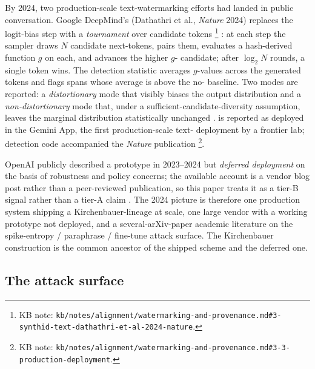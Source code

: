 By 2024, two production-scale text-watermarking efforts had landed in
public conversation. Google DeepMind's \textbf{} (Dathathri
et al., \emph{Nature} 2024) replaces the logit-bias step with a
\emph{tournament} over candidate tokens%
\footnote{KB note: \texttt{kb/notes/alignment/watermarking-and-provenance.md\#3-synthid-text-dathathri-et-al-2024-nature}.}
: at each
step the sampler draws $N$ candidate next-tokens, pairs them, evaluates
a hash-derived  function $g$ on each, and advances the higher
$g$- candidate; after $\log_2 N$ rounds, a single token wins. The
detection statistic averages $g$-values across the generated tokens and
flags spans whose average is above the no- baseline. Two modes
are reported: a \emph{distortionary} mode that visibly biases the
output distribution and a \emph{non-distortionary} mode that, under
a sufficient-candidate-diversity assumption, leaves the marginal
distribution statistically unchanged .  is reported as
deployed in the Gemini App, the first production-scale text-
deployment by a frontier lab; detection code accompanied the
\emph{Nature} publication%
\footnote{KB note: \texttt{kb/notes/alignment/watermarking-and-provenance.md\#3-3-production-deployment}.}.

OpenAI publicly described a  prototype in 2023--2024 but
\emph{deferred deployment} on the basis of robustness and policy
concerns; the available account is a vendor blog post rather than a
peer-reviewed publication, so this paper treats it as a tier-B signal
rather than a tier-A claim
.
The 2024 picture is therefore one production system shipping a
Kirchenbauer-lineage  at scale, one large vendor with a
working prototype not deployed, and a several-arXiv-paper academic
literature on the spike-entropy / paraphrase / fine-tune attack
surface. The Kirchenbauer construction is the common ancestor of the
shipped scheme and the deferred one.

\subsection{The attack surface}
\label{sec:watermarking-attacks}

